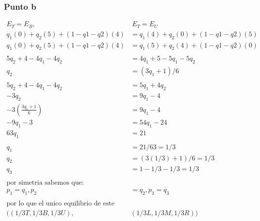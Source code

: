 \documentclass[11pt]{article}
\begin{document}
\subsubsection{Punto b}
\begin{flushleft}
    \begin{align*}
        E_T=E_B, ~&~ E_T = E_U\\
        q_1(0)+q_2(5)+(1-q1-q2)(4)&=q_1(4)+q_2(0)+(1-q1-q2)(5)\\
        q_1(0)+q_2(5)+(1-q1-q2)(4)&= q_1(5)+q_2(4)+(1-q1-q2)(0)\\~\\
        5q_2+4-4q_1-4q_2&=4q_1+5-5q_1-5q_2\\
        q_2&=(3q_1+1)/6\\~\\
        5q_2+4-4q_1-4q_2&=5q_1+4q_2\\
        -3q_2&=9q_1-4\\
        -3\left(\frac{3q_1+1}{6}\right)&=9q_1-4\\
        -9q_1-3&=54q_1-24\\
        63q_1&=21\\~\\
        q_1&=21/63=1/3\\
        q_2&=(3(1/3)+1)/6=1/3\\
        q_3&=1-1/3-1/3=1/3\\~\\
        \text{por simetria sabemos que: }\\
        p_1=q_1, p_2&=q_2,p_3=q_3\\~\\
        \text{por lo que el unico equilibrio de este juego es: }\\
        ((1/3T,1/3B,1/3U),&(1/3L,1/3M,1/3R))
    \end{align*}
\end{flushleft}
\end{document}
